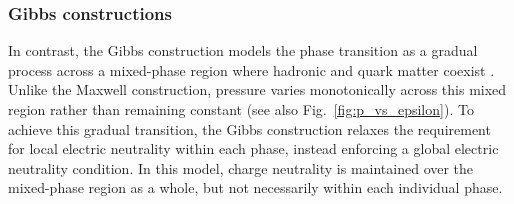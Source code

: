 \documentclass[main.tex]{subfiles}
\begin{document}
    




    \subsubsection{Gibbs constructions}
    In contrast, the Gibbs construction models the phase transition as a gradual process across a mixed-phase region where hadronic and quark matter coexist \citep[see][]{Glendenning:1992vb}. Unlike the Maxwell construction, pressure varies monotonically across this mixed region rather than remaining constant (see also Fig.~\ref{fig:p_vs_epsilon}). To achieve this gradual transition, the Gibbs construction relaxes the requirement for local electric neutrality within each phase, instead enforcing a global electric neutrality condition. In this model, charge neutrality is maintained over the mixed-phase region as a whole, but not necessarily within each individual phase.
\end{document}
